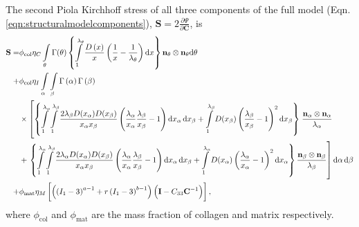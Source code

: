 The second Piola Kirchhoff stress of all three components of the full model (Eqn. \ref{eqn:structuralmodelcomponents}), $\mathbf{S}=2\frac{\partial\Psi}{\partial\mathbf{C}}$, is 
\begin{equation} \label{eqn:fullcollagen}
\begin{aligned}
\mathbf{S} = & \phi_\mathrm{col} \eta_C \int\displaylimits_\theta \Gamma(\theta)\left\lbrace 
\int\displaylimits_1^{\lambda_\theta} \frac{D\left( x \right)}{x} \left( \frac{1}{x}- \frac{1}{\lambda_\theta}\right) \mathrm{d}x \right\rbrace \mathbf{n}_\theta\otimes\mathbf{n}_\theta \mathrm{d}\theta \\
+ & \phi_\mathrm{col} \eta_I \int\displaylimits_\alpha \int\displaylimits_\beta \Gamma \left(\alpha \right) \Gamma \left( \beta \right) \\
& \times \left[ \left\lbrace 
\int\displaylimits_1^{\lambda_\alpha} \int\displaylimits_1^{\lambda_\beta} 
\frac{2 \lambda_\beta D(x_\alpha) D(x_\beta)}{x_\alpha x_\beta} 
\left( \frac{\lambda_\alpha}{x_\alpha} \frac{\lambda_\beta}{x_\beta} - 1\right) \mathrm{d}x_\alpha \, \mathrm{d}x_\beta 
+\int\displaylimits_1^{\lambda_\beta} D(x_\beta) \left( \frac{\lambda_\beta}{x_\beta} -1  \right)^2 \mathrm{d}x_\beta \right\rbrace \right.  \frac{\mathbf{n}_\alpha \otimes \mathbf{n}_\alpha}{\lambda_\alpha}  \\
& + \left. \left\lbrace
\int\displaylimits_1^{\lambda_\alpha} \int\displaylimits_1^{\lambda_\beta} 
\frac{2 \lambda_\alpha D(x_\alpha) D(x_\beta)}{x_\alpha x_\beta} 
\left( \frac{\lambda_\alpha}{x_\alpha} \frac{\lambda_\beta}{x_\beta} - 1\right) \mathrm{d}x_\alpha \, \mathrm{d}x_\beta 
+ \int\displaylimits_1^{\lambda_\alpha} D(x_\alpha) \left( \frac{\lambda_\alpha}{x_\alpha} -1  \right)^2 \mathrm{d}x_\alpha \right\rbrace \frac{\mathbf{n}_\beta \otimes \mathbf{n}_\beta}{\lambda_\beta}  \right] \mathrm{d}\alpha \, \mathrm{d}\beta\\
+ & \phi_\mathrm{mat} \eta_M \left[\left(\left( I_1 - 3\right)^{a - 1} + r \left( I_1 - 3\right)^{b - 1}\right) \left( \mathbf{I} - C_{33}\mathbf{C}^{-1}\right)  \right],\\
\end{aligned}
\end{equation}
where $\phi_\mathrm{col}$ and $\phi_\mathrm{mat}$ are the mass fraction of collagen and matrix respectively. 
    
